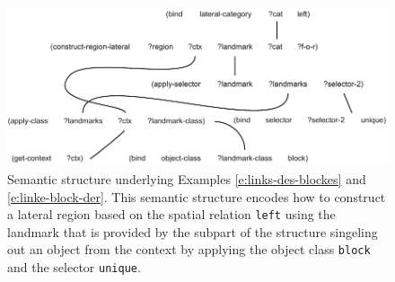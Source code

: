 \begin{figure}
\begin{center}
\includegraphics[width=1.0\columnwidth]{figs/semantic-structure-links-des-blockes}
\end{center}
\caption[Semantic structure example lateral region with landmark]{%
Semantic structure underlying Examples \ref{e:links-des-blockes}
and \ref{e:linke-block-der}. This semantic structure encodes how to construct
a lateral region based on the spatial relation {\footnotesize\tt left} using the landmark 
that is provided by the subpart of the structure singeling out an object from the context
by applying the object class {\footnotesize\tt block} and the selector {\footnotesize\tt unique}.}
\label{f:semantic-structure-2}
\end{figure}
